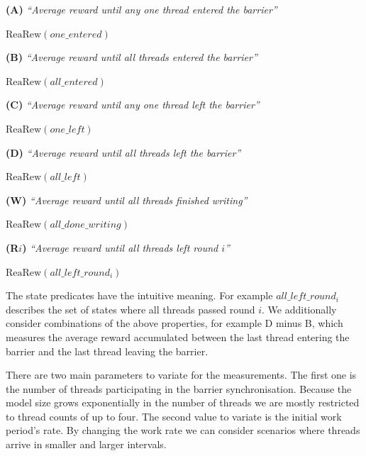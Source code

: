 \documentclass[a4paper, 10pt]{article}
\begin{document}
\vspace{0.2cm}
\noindent \textbf{(A)} \emph{``Average reward until any one thread entered the barrier''}
\begin{center}
	$\mathrm{ReaRew}( \mathit{one\_entered} )$
\end{center}

\vspace{0.2cm}
\noindent \textbf{(B)} \emph{``Average reward until all threads entered the barrier''}
\begin{center}
	$\mathrm{ReaRew}( \mathit{all\_entered} )$
\end{center}

\vspace{0.2cm}
\noindent \textbf{(C)} \emph{``Average reward until any one thread left the barrier''}
\begin{center}
	$\mathrm{ReaRew}( \mathit{one\_left} )$
\end{center}

\vspace{0.2cm}
\noindent \textbf{(D)} \emph{``Average reward until all threads left the barrier''}
\begin{center}
	$\mathrm{ReaRew}( \mathit{all\_left} )$
\end{center}

\vspace{0.2cm}
\noindent \textbf{(W)} \emph{``Average reward until all threads finished writing''}
\begin{center}
	$\mathrm{ReaRew}( \mathit{all\_done\_writing} )$
\end{center}

\vspace{0.2cm}
\noindent \textbf{(R$i$)} \emph{``Average reward until all threads left round $i$''}
\begin{center}
	$\mathrm{ReaRew}( \mathit{all\_left\_round_{i}} )$
\end{center}

\noindent The state predicates have the intuitive meaning. For example $\mathit{all\_left\_round_{i}}$ describes the set of states where all threads passed round $i$.
We additionally consider combinations of the above properties, for example D minus B, which measures the average reward accumulated between the last thread entering the barrier and the last thread leaving the barrier.

There are two main parameters to variate for the measurements. The first one is the number of threads participating in the barrier synchronisation. Because the model size grows exponentially in the number of threads we are mostly restricted to thread counts of up to four.
The second value to variate is the initial work period's rate. By changing the work rate we can consider scenarios where threads arrive in smaller and larger intervals.
\end{document}
